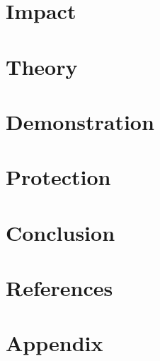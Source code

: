 \documentclass[11pt,a4paper]{article}
\begin{document}
\section{Impact}
\section{Theory}
\section{Demonstration}
\section{Protection}
\section{Conclusion}

\section{References}

\section{Appendix}
\end{document}
